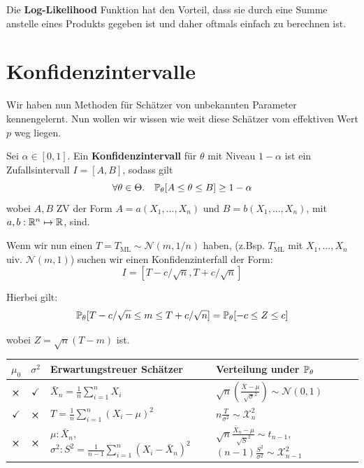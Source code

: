 Die \textbf{Log-Likelihood} Funktion hat den Vorteil, dass sie durch eine Summe anstelle eines Produkts gegeben ist und daher oftmals einfach zu berechnen ist.


\section{Konfidenzintervalle}

Wir haben nun Methoden für Schätzer von unbekannten Parameter kennengelernt. Nun wollen wir wissen wie weit diese Schätzer vom effektiven Wert $p$ weg liegen.

\begin{tcolorbox}
    Sei $\alpha \in [0,1]$. Ein \textbf{Konfidenzintervall} für $\theta$ mit Niveau $1 - \alpha$ ist ein Zufallsintervall $I = [A, B]$, sodass gilt 
    $$\forall \theta \in \Theta. \quad \mathbb{P}_\theta[A \leq \theta \leq B] \geq 1 - \alpha$$
    wobei $A,B$ ZV der Form $A = a (X_1, ..., X_n)$ und $B = b (X_1, ..., X_n)$, mit $a,b : \mathbb{R}^n \mapsto \mathbb{R}$, sind.
\end{tcolorbox}

Wenn wir nun einen $T = T_{\text{ML}} \sim \mathcal{N}(m, 1/n)$ haben, (z.Bsp. $T_{\text{ML}}$ mit $X_1,...,X_n$ uiv. $\mathcal{N}(m, 1)$) suchen wir einen Konfidenzinterfall der Form: 
$$I = [T - c/\sqrt{n}, T + c / \sqrt{n}]$$

Hierbei gilt:
$$\mathbb{P}_\theta[T - c/\sqrt{n} \leq m \leq T + c/\sqrt{n}] = \mathbb{P}_\theta[-c \leq Z \leq c]$$

wobei $Z = \sqrt{n}(T-m)$ ist.

\renewcommand\arraystretch{1.8}
\begin{center}
    \begin{tabular}{c|c|p{4cm}|p{2.75cm}}
  		$\mu_0$ & $\sigma^2$ & Erwartungstreuer Schätzer & Verteilung under $\mathbb{P}_\theta$ \\
  		\hline
  		\hline
  		$\cross$ & $\checkmark$ & $\bar X_n = \frac{1}{n} \sum_{i=1}^n X_i$ & $\sqrt n (\frac{\bar X - \mu}{\sqrt \sigma^2}) \sim \mathcal{N}(0,1) $ \\
  		\hline
  		$\checkmark$ & $\cross$ & $T = \frac{1}{n} \sum_{i=1}^n (X_i - \mu)^2$ & $n \frac{T}{\sigma^2} \sim \mathcal{X}_n^2$ \\
  		\hline
  		$\cross$ & $\cross$ & $\mu: \bar X_n$, \medskip \newline $\sigma^2 : S^2 = \frac{1}{n-1} \sum_{i=1}^n(X_i - \bar X_n)^2$ & $ \sqrt n \frac{\bar X_n - \mu}{\sqrt S^2} \sim t_{n-1}$, \smallskip \newline $(n-1) \frac{S^2}{\sigma^2} \sim \mathcal{X}_{n-1}^2$ 
	\end{tabular}
\end{center}
\renewcommand{\arraystretch}{1}


